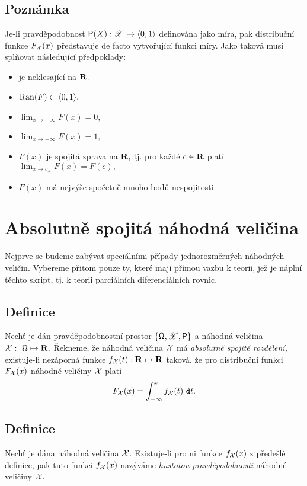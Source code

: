 \subsection{Poznámka}
Je-li pravd\v epodobnost $\mbox{\sf P}(X): \mathscr{X} \mapsto \langle 0, 1\rangle$ definov\'ana jako m\'ira, pak distribu\v cn\'i funkce $F_{\mathcal X}(x)$ p\v redstavuje de facto vytvo\v ruj\'ic\'i funkci m\'iry. Jako takov\'a mus\'i spl\v novat n\'asleduj\'ic\'i p\v redpoklady:
\begin{itemize}
    \item je neklesající na ${\mathbf R},$
    \item ${\mathrm{Ran}}(F) \subset \langle 0,1 \rangle,$
    \item $\lim_{x \rightarrow -\infty} F(x) = 0,$
    \item $\lim_{x \rightarrow +\infty} F(x) = 1,$
    \item $F(x)$ je spojitá zprava na ${\mathbf R},$ tj. pro ka\v zd\'e $c\in{\mathbf R}$ plat\'i $\lim_{x\rightarrow c_+}F(x)=F(c),$
    \item $F(x)$ má nejvýše spočetně mnoho bodů nespojitosti.
\end{itemize}


\section{Absolutn\v e spojit\'a n\'ahodn\'a veli\v cina}

Nejprve se budeme zab\'yvat speci\'aln\'imi p\v r\'ipady jednorozm\v ern\'ych n\'ahodn\'ych veli\v cin. Vybereme p\v ritom pouze ty, kter\'e maj\'i p\v r\'imou vazbu k teorii, je\v z je n\'apln\'i t\v echto skript, tj. k teorii parci\'aln\'ich diferenci\'aln\'ich rovnic.

\subsection{Definice}
Nech\v t je d\'an pravd\v epodobnostn\'i prostor $\{\Omega,\mathscr{X},\mbox{\sf P}\}$ a n\'ahodn\'a veli\v cina ${\mathcal X}:~\Omega \mapsto {\mathbf R}.$ \v Rekneme, \v ze n\'ahodn\'a veli\v cina ${\mathcal X}$ m\'a \emph{absolutn\v e
spojit\'e rozd\v elen\'i,} existuje-li nez\'aporn\'a funkce $f_{\mathcal X}(t):{\mathbf R}\mapsto{\mathbf R}$
takov\'a, \v ze pro distribu\v cn\'i funkci $F_{\mathcal X}(x)$ n\'ahodn\'e
veli\v ciny ${\mathcal X}$ plat\'i $$F_{\mathcal X}(x) = \int^{x}_{-\infty} f_{\mathcal X}(t)~\mathtt{d}t.$$


\subsection{Definice}
Nech\v t je d\'ana n\'ahodn\'a veli\v cina ${\mathcal X}.$ Existuje-li pro ni
funkce $f_{\mathcal X}(x)$ z p\v rede\v slé definice, pak tuto funkci $f_{\mathcal X}(x)$
naz\'yv\'ame \emph{hustotou pravděpodobnosti} n\'ahodn\'e veli\v
ciny ${\mathcal X}.$

